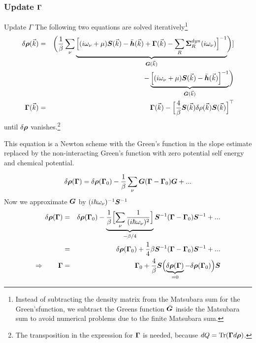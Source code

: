 \documentclass[11pt,a4paper]{report}
\begin{document}
\subsubsection{Update $\bm{\Gamma}$}
\begin{myshadowminipage}{Update $\Gamma$}
The following two equations are solved iteratively\footnote{Instead of
  subtracting the density matrix from the Matsubara sum for the
  Green'sfunction, we subtract the Greens function $\bar{\bm{G}}$
  inside the Matsubara sum to avoid numerical problems due to the
  finite Matsubara sum.}
\begin{eqnarray}
\delta\bm{\rho}(\vec{k})&=&
\biggl(\frac{1}{\beta}\sum_\nu
\underbrace{\Bigl[
(i\omega_\nu+\mu)\bm{S}(\vec{k})-\bar{\bm{h}}(\vec{k})+\bm{\Gamma}(\vec{k})
-\sum_R\bm{\Sigma}^{dyn}_R(i\omega_\nu)
\Bigr]^{-1}}_{\bm{G}(\vec{k})}\biggr)
\nonumber]\\
&&\hspace{1cm}-\underbrace{\Bigl[
(i\omega_\nu+\mu)\bm{S}(\vec{k})-\bar{\bm{h}}(\vec{k})\Bigr]^{-1}
}_{\bar{\bm{G}}(\vec{k})}\biggr)
\nonumber\\
\bm{\Gamma}(\vec{k})&=&
\bm{\Gamma}(\vec{k})-
\Bigl[\frac{4}{\beta}\bm{S}(\vec{k})
\delta{\rho}(\vec{k})
\bm{S}(\vec{k})\Bigr]^\top
\end{eqnarray}
until $\delta\bm{\rho}$ vanishes.\footnote{The transposition in the
  expression for $\bm{\Gamma}$ is needed, because
  $dQ=\mathrm{Tr}(\bm{\Gamma}d\bm{\rho})$.}
\end{myshadowminipage}
This equation is a Newton scheme with the Green's function in the
slope estimate replaced by the non-interacting Green's function with
zero potential self energy and chemical potential. 

\begin{eqnarray}
\delta\bm{\rho}(\bm{\Gamma})=\delta\bm{\rho}(\bm{\Gamma}_0)
-\frac{1}{\beta}\sum_\nu \bm{G}(\bm{\Gamma}-\bm{\Gamma}_0)\bm{G}+...
\end{eqnarray}
Now we approximate $\bm{G}$ by $(i\hbar\omega_\nu)^{-1}\bm{S}^{-1}$
\begin{eqnarray}
\delta\bm{\rho}(\bm{\Gamma})
&=&\delta\bm{\rho}(\bm{\Gamma}_0)
-
\underbrace{\frac{1}{\beta}
\Bigl[\sum_\nu\frac{1}{(i\hbar\omega_\nu)^2} \Bigr]}
_{-\beta/4}
\bm{S}^{-1}(\bm{\Gamma}-\bm{\Gamma}_0)\bm{S}^{-1}+...
\nonumber\\
&=&\delta\bm{\rho}(\bm{\Gamma}_0)
+\frac{1}{4}\beta
\bm{S}^{-1}(\bm{\Gamma}-\bm{\Gamma}_0)\bm{S}^{-1}+...
\nonumber\\
\Rightarrow\qquad\bm{\Gamma}&=&\bm{\Gamma}_0
+\frac{4}{\beta}
\bm{S}
\Bigl(\underbrace{\delta\bm{\rho}(\bm{\Gamma})}_{=0}-\delta\bm{\rho}(\bm{\Gamma}_0)\Bigr)
\bm{S}
\end{eqnarray}
\end{document}
